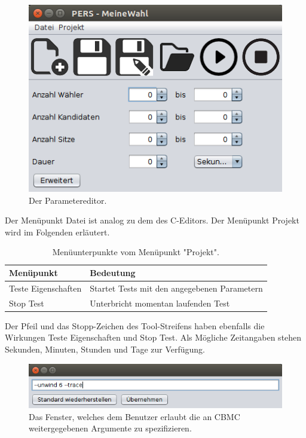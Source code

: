 \documentclass[a4paper]{scrreprt}
\begin{document}
\begin{figure}[H]
\includegraphics[scale=0.6]{Parameter-Editor.png}
\caption{Der Parametereditor.}
\label{Parameter-editor}
\end{figure}

Der Menüpunkt Datei ist analog zu dem des C-Editors. Der Menüpunkt Projekt wird im Folgenden erläutert. 

\begin{table}[H]
\begin{tabular}{|p{5cm}|p{10cm}|}
Menüpunkt & Bedeutung \\
\hline
Teste Eigenschaften & Startet Tests mit den angegebenen Parametern \\ \hline
Stop Test & Unterbricht momentan laufenden Test
\end{tabular}
\label{Parameter-Projekt-Menü}
\caption{Menüunterpunkte vom Menüpunkt "Projekt".}
\end{table}

Der Pfeil und das Stopp-Zeichen des Tool-Streifens haben ebenfalls die Wirkungen Teste Eigenschaften und Stop Test. Als Mögliche Zeitangaben stehen Sekunden, Minuten, Stunden und Tage zur Verfügung. 

\begin{figure}[H]
\includegraphics[scale=0.6]{CBMC-Args-Editor.png}
\caption{Das Fenster, welches dem \gls{Benutzer} erlaubt die an CBMC weitergegebenen Argumente zu spezifizieren.}
\label{Argumente-editor}
\end{figure}
\end{document}
